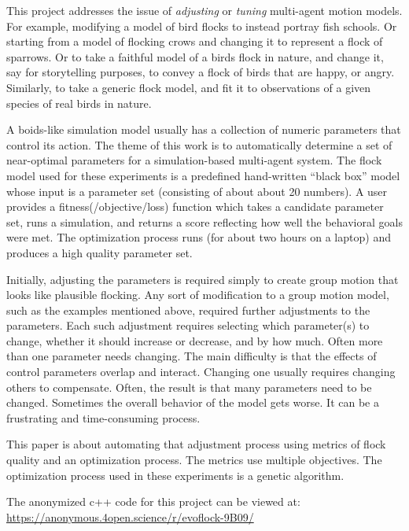 \documentclass[letterpaper]{article}
\begin{document}
This project addresses the issue of \textit{adjusting} or \textit{tuning} multi-agent motion models. For example, modifying a model of bird flocks to instead portray fish schools. Or starting from a model of flocking crows and changing it to represent a flock of sparrows. Or to take a faithful model of a birds flock in nature, and change it, say for storytelling purposes, to convey a flock of birds that are happy, or angry. Similarly, to take a generic flock model, and fit it to observations of a given species of real birds in nature.

A boids-like simulation model usually has a collection of numeric parameters that control its action. The theme of this work is to automatically determine a set of near-optimal parameters for a simulation-based multi-agent system. The flock model used for these experiments is a predefined hand-written ``black box'' model whose input is a parameter set (consisting of about about 20 numbers). A user provides a fitness(/objective/loss) function which takes a candidate parameter set, runs a simulation, and returns a score reflecting how well the behavioral goals were met. The optimization process runs (for about two hours on a laptop) and produces a high quality parameter set.

Initially, adjusting the parameters is required simply to create group motion that looks like plausible flocking. Any sort of modification to a group motion model, such as the examples mentioned above, required further adjustments to the parameters. Each such adjustment requires selecting which parameter(s) to change, whether it should increase or decrease, and by how much. Often more than one parameter needs changing. The main difficulty is that the effects of control parameters overlap and interact. Changing one usually requires changing others to compensate. Often, the result is that many parameters need to be changed. Sometimes the overall behavior of the model gets worse. It can be a frustrating and time-consuming process.

This paper is about automating that adjustment process using metrics of flock quality and an optimization process. The metrics use multiple objectives. The optimization process used in these experiments is a genetic algorithm.

The anonymized c++ code for this project can be viewed at:
\scriptsize
\url{https://anonymous.4open.science/r/evoflock-9B09/}
\normalsize


\end{document}
